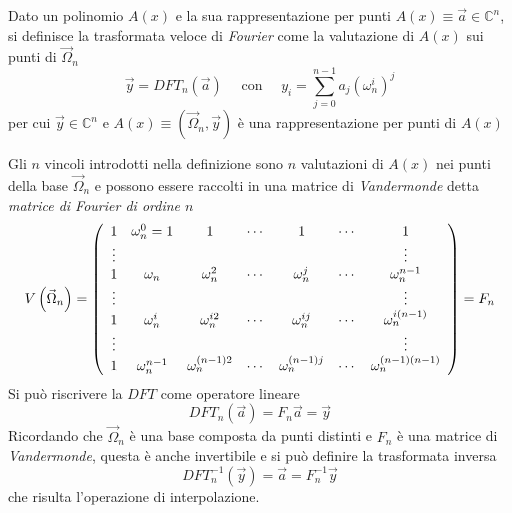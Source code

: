 \begin{definition}
    Dato un polinomio $A(x)$ e la sua rappresentazione per punti $A(x) \equiv \vec{a} \in \mathbb{C}^n$, si definisce la trasformata veloce di \textit{Fourier} come la valutazione di $A(x)$ sui punti di $\vec{\Omega}_n$
    \begin{equation*}
        \vec{y} = DFT_n \left( \vec{a} \right) \quad \text{ con } \quad y_i = \sum_{j=0}^{n-1} a_j \left( \omega_n^{i} \right)^{j}
    \end{equation*}
    per cui $\vec{y} \in \mathbb{C}^n$ e $A(x) \equiv \left( \vec{\Omega}_n , \vec{y} \right)$ è una rappresentazione per punti di $A(x)$
    \label{def:dft}
\end{definition}
Gli $n$ vincoli introdotti nella definizione sono $n$ valutazioni di $A(x)$ nei punti della base $\vec{\Omega}_n$ e possono essere raccolti in una matrice di \textit{Vandermonde} detta \emph{matrice di \emph{Fourier} di ordine $n$}
\begin{equation*}
    V\left( \vec{\Omega}_n \right) = \left( 
        \begin{array}[h]{ccccccc}
            1 & \omega_n^0 = 1 & 1 & \cdots & 1 & \cdots & 1 \\
            \vdots &&&&&& \vdots\\
            1 & \omega_n & \omega_n^2 & \cdots & \omega_n^j & \cdots & \omega_n^{n-1} \\
            \vdots &&&&&& \vdots\\
            1 & \omega_n^{i} & \omega_{n}^{i2} & \cdots & \omega_{n}^{ij} & \cdots & \omega_n^{i\left( n-1 \right)} \\
            \vdots &&&&&& \vdots\\
            1 & \omega_n^{n-1} & \omega_{n}^{\left( n-1 \right) 2} & \cdots & \omega_{n}^{\left( n-1 \right) j} & \cdots & \omega_n^{\left( n-1 \right) \left( n-1 \right)} \\
        \end{array}
    \right) = F_n
\end{equation*}
Si può riscrivere la $DFT$ come operatore lineare
\begin{equation*}
    DFT_n\left( \vec{a} \right) = F_n \vec{a} = \vec{y}
\end{equation*}
Ricordando che $\vec{\Omega}_n$ è una base composta da punti distinti e $F_n$ è una matrice di \textit{Vandermonde}, questa è anche invertibile e si può definire la trasformata inversa
\begin{equation*}
    DFT_n^{-1} \left( \vec{y} \right) = \vec{a} = F_n^{-1} \vec{y}
\end{equation*}
che risulta l'operazione di interpolazione.

